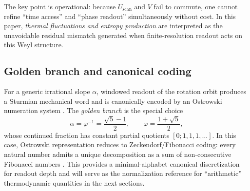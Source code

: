 \noindent The key point is operational: because $U_{\mathrm{scan}}$ and $V$ fail to commute, one cannot refine ``time access'' and ``phase readout'' simultaneously without cost. In this paper, \emph{thermal fluctuations and entropy production} are interpreted as the unavoidable residual mismatch generated when finite-resolution readout acts on this Weyl structure.

\subsection{Golden branch and canonical coding}
\label{subsec:golden_branch}

For a generic irrational slope $\alpha$, windowed readout of the rotation orbit produces a Sturmian mechanical word and is canonically encoded by an Ostrowski numeration system \cite{MorseHedlund1940,Lothaire2002,AlloucheShallit2003}. The \emph{golden branch} is the special choice
\begin{equation}
\alpha=\varphi^{-1}=\frac{\sqrt{5}-1}{2},\qquad \varphi=\frac{1+\sqrt{5}}{2},
\end{equation}
whose continued fraction has constant partial quotients $[0;1,1,1,\dots]$. In this case, Ostrowski representation reduces to Zeckendorf/Fibonacci coding: every natural number admits a unique decomposition as a sum of non-consecutive Fibonacci numbers \cite{Zeckendorf1972}. This provides a minimal-alphabet canonical discretization for readout depth and will serve as the normalization reference for ``arithmetic'' thermodynamic quantities in the next sections.



